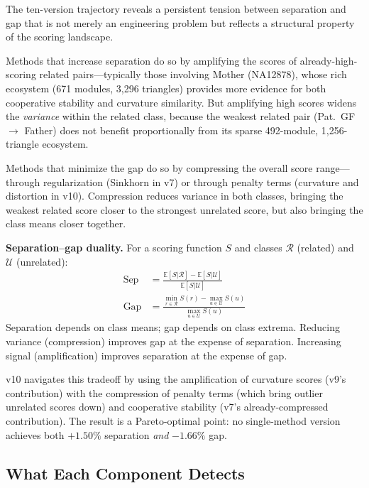 \documentclass{../yalumba}
\begin{document}
The ten-version trajectory reveals a persistent tension between
separation and gap that is not merely an engineering problem but
reflects a structural property of the scoring landscape.

Methods that increase separation do so by amplifying the scores of
already-high-scoring related pairs---typically those involving Mother
(NA12878), whose rich ecosystem (671 modules, 3{,}296 triangles)
provides more evidence for both cooperative stability and curvature
similarity.  But amplifying high scores widens the \emph{variance}
within the related class, because the weakest related pair
(Pat.~GF $\to$ Father) does not benefit proportionally from its
sparse 492-module, 1{,}256-triangle ecosystem.

Methods that minimize the gap do so by compressing the overall score
range---through regularization (Sinkhorn in v7) or through penalty
terms (curvature and distortion in v10).  Compression reduces variance
in both classes, bringing the weakest related score closer to the
strongest unrelated score, but also bringing the class means closer
together.

\begin{definition}
\textbf{Separation--gap duality.}  For a scoring function $S$ and
classes $\mathcal{R}$ (related) and $\mathcal{U}$ (unrelated):
\begin{align}
\text{Sep} &= \frac{\mathbb{E}[S|\mathcal{R}] -
  \mathbb{E}[S|\mathcal{U}]}{\mathbb{E}[S|\mathcal{U}]} \\
\text{Gap} &= \frac{\min_{r \in \mathcal{R}} S(r) -
  \max_{u \in \mathcal{U}} S(u)}{\max_{u \in \mathcal{U}} S(u)}
\end{align}
Separation depends on class means; gap depends on class extrema.
Reducing variance (compression) improves gap at the expense of
separation.  Increasing signal (amplification) improves separation at
the expense of gap.
\end{definition}

v10 navigates this tradeoff by using the amplification of curvature
scores (v9's contribution) with the compression of penalty terms (which
bring outlier unrelated scores down) and cooperative stability (v7's
already-compressed contribution).  The result is a Pareto-optimal
point: no single-method version achieves both $+1.50\%$ separation
\emph{and} $-1.66\%$ gap.

\subsection{What Each Component Detects}
\end{document}
